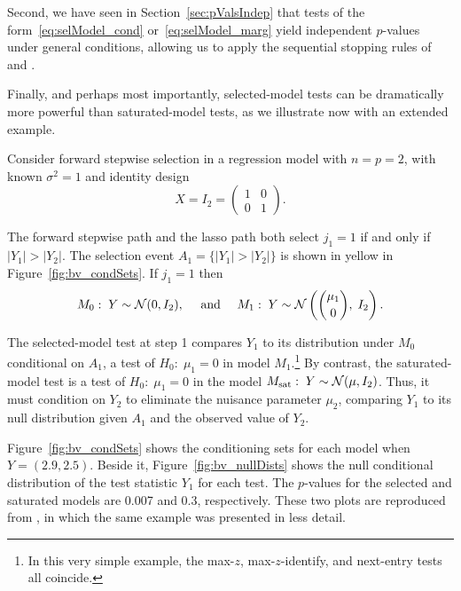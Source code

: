 \documentclass{article}
\begin{document}
Second, we have seen in Section~\ref{sec:pValsIndep} that tests of the form~\eqref{eq:selModel_cond} or~\eqref{eq:selModel_marg} yield independent $p$-values under general conditions, allowing us to apply  the sequential stopping rules of~\citet{gsell2013sequential} and \citet{li2015accumulation}.

Finally, and perhaps most importantly, selected-model tests can be dramatically more powerful than saturated-model tests, as we illustrate now with an extended example.

\begin{example}\label{ex:bivariate}
  Consider forward stepwise selection in a regression model with $n=p=2$, with known $\sigma^2=1$ and identity design 
\[
X = I_2=\begin{pmatrix} 1 & 0 \\ 0 & 1\end{pmatrix}.
\] 

The forward stepwise path and the lasso path both select $j_1=1$ if and only if $|Y_1|>|Y_2|$. The selection event $A_1=\{|Y_1| > |Y_2|\}$ is shown in yellow in Figure~\ref{fig:bv_condSets}. If $j_1=1$ then
\[
M_0:\; Y\sim \mathcal{N}(0,I_2), \quad \text{ and } \quad
M_1:\; Y \sim \mathcal{N}\left(\binom{\mu_1}{0}, \; I_2\right).
\]

The selected-model test at step 1 compares $Y_1$ to its distribution under $M_0$ conditional on $A_1$, a test of $H_0:\;\mu_1=0$ in model $M_1$.\footnote{In this very simple example, the max-$z$, max-$z$-identify, and next-entry tests all coincide.} By contrast, the saturated-model test is a test of $H_0:\; \mu_1=0$ in the model $M_{\text{sat}}:\; Y \sim \mathcal{N}(\mu, I_2)$. Thus, it must condition on $Y_2$ to eliminate the nuisance parameter $\mu_2$, comparing $Y_1$ to its null distribution given $A_1$ and the observed value of $Y_2$.

Figure~\ref{fig:bv_condSets} shows the conditioning sets for each model when $Y=(2.9, 2.5)$. Beside it, Figure~\ref{fig:bv_nullDists} shows the null conditional distribution of the test statistic $Y_1$ for each test. The $p$-values for the selected and saturated models are 0.007 and 0.3, respectively. These two plots are reproduced from \citet{fithian2014optimal}, in which the same example was presented in less detail.
\end{example}
\end{document}
